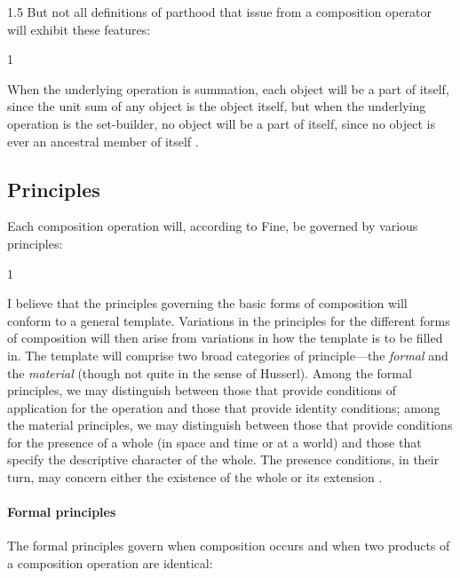 \documentclass[11pt]{article}
\newenvironment{squote}{%
\begin{spacing}{1}
\begin{list}{}{%
\setlength{\labelwidth}{0pt}%
\rightmargin\leftmargin%
}
\item\relax
}{%
\end{list}%
\end{spacing}
}
\begin{document}
\begin{spacing}{1.5}
But not all definitions of parthood that issue from a composition
operator will exhibit these features:

\begin{squote}
When the underlying operation is summation, each object will be a part
of itself, since the unit sum of any object is the object itself, but
when the underlying operation is the set-builder, no object will be a
part of itself, since no object is ever an ancestral member of itself
\citep[569]{fine2010}.
\end{squote}

\subsection{Principles}
\label{principle}
Each composition operation will, according to Fine, be governed by
various principles:

\begin{squote}
I believe that the principles governing the basic forms of composition
will conform to a general template.  Variations in the principles for
the different forms of composition will then arise from variations in
how the template is to be filled in.  The template will comprise two
broad categories of principle---the {\em formal} and the {\em
  material} (though not quite in the sense of Husserl).  Among the
formal principles, we may distinguish between those that provide
conditions of application for the operation and those that provide
identity conditions; among the material principles, we may distinguish
between those that provide conditions for the presence of a whole (in
space and time or at a world) and those that specify the descriptive
character of the whole.  The presence conditions, in their turn, may
concern either the existence of the whole or its extension
\citeyearpar[569--570]{fine2010}.
\end{squote}

\paragraph{Formal principles}
\label{formal}
The formal principles govern when composition occurs and when two
products of a composition operation are identical:


\end{spacing}
\end{document}
